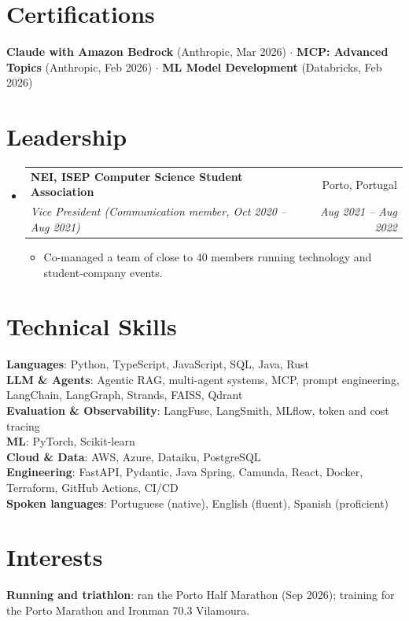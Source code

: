 \documentclass[a4paper,11pt]{article}
\makeatletter
\newcommand{\resumeItem}[1]{
  \item\small{
    {#1 \vspace{-2pt}}
  }
}
\newcommand{\resumeSubheading}[4]{
  \vspace{-2pt}\item
    \begin{tabular*}{0.97\textwidth}[t]{l@{\extracolsep{\fill}}r}
      \textbf{#1} & #2 \\
      \textit{\small#3} & \textit{\small #4} \\
    \end{tabular*}\vspace{-7pt}
}
\newcommand{\resumeSubHeadingListStart}{\begin{itemize}[leftmargin=0.15in, label={}]}
\newcommand{\resumeSubHeadingListEnd}{\end{itemize}}
\newcommand{\resumeItemListStart}{\begin{itemize}[itemsep=0pt,topsep=2pt]}
\newcommand{\resumeItemListEnd}{\end{itemize}\vspace{-5pt}}
\makeatother
\begin{document}
\section{Certifications}
 \begin{itemize}[leftmargin=0.15in, label={}]
    \small{\item{
     \textbf{Claude with Amazon Bedrock} (Anthropic, Mar 2026) $\cdot$ \textbf{MCP: Advanced Topics} (Anthropic, Feb 2026) $\cdot$ \textbf{ML Model Development} (Databricks, Feb 2026)
    }}
 \end{itemize}

\section{Leadership}
  \resumeSubHeadingListStart
    \resumeSubheading
      {NEI, ISEP Computer Science Student Association}{Porto, Portugal}
      {Vice President (Communication member, Oct 2020 -- Aug 2021)}{Aug 2021 -- Aug 2022}
      \resumeItemListStart
        \resumeItem{Co-managed a team of close to 40 members running technology and student-company events.}
      \resumeItemListEnd
  \resumeSubHeadingListEnd

\section{Technical Skills}
 \begin{itemize}[leftmargin=0.15in, label={}]
    \small{\item{
     \textbf{Languages}{: Python, TypeScript, JavaScript, SQL, Java, Rust} \\
     \textbf{LLM \& Agents}{: Agentic RAG, multi-agent systems, MCP, prompt engineering, LangChain, LangGraph, Strands, FAISS, Qdrant} \\
     \textbf{Evaluation \& Observability}{: LangFuse, LangSmith, MLflow, token and cost tracing} \\
     \textbf{ML}{: PyTorch, Scikit-learn} \\
     \textbf{Cloud \& Data}{: AWS, Azure, Dataiku, PostgreSQL} \\
     \textbf{Engineering}{: FastAPI, Pydantic, Java Spring, Camunda, React, Docker, Terraform, GitHub Actions, CI/CD} \\
     \textbf{Spoken languages}{: Portuguese (native), English (fluent), Spanish (proficient)}
    }}
 \end{itemize}

\section{Interests}
 \begin{itemize}[leftmargin=0.15in, label={}]
    \small{\item{
     \textbf{Running and triathlon}{: ran the Porto Half Marathon (Sep 2026); training for the Porto Marathon and Ironman 70.3 Vilamoura.}
    }}
 \end{itemize}
\end{document}

